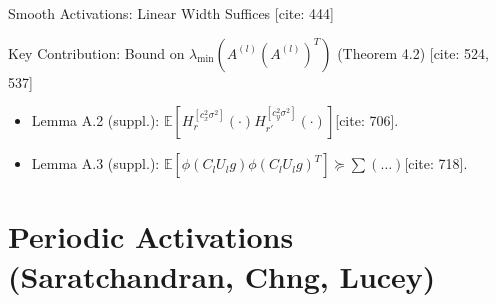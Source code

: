 \documentclass{beamer}
\theoremstyle{definition}
\theoremstyle{remark}
\newcommand{\E}{\mathbb{E}}
\newcommand{\lambdaMin}{\lambda_{\min}}
\begin{document}
\begin{frame}{Smooth Activations: Linear Width Suffices [cite: 444]}
\begin{block}{Key Contribution: Bound on $\lambdaMin(A^{(l)}(A^{(l)})^T)$ (Theorem 4.2) [cite: 524, 537]}
\begin{enumerate}
        \begin{itemize}
          \item Lemma A.2 (suppl.): $\E[H_r^{[c_x^2\sigma^2]}(\cdot) H_{r'}^{[c_y^2\sigma^2]}(\cdot)]$[cite: 706].
          \item Lemma A.3 (suppl.): $\E[\phi(C_lU_lg)\phi(C_lU_lg)^T] \succeq \sum (\dots)$[cite: 718].
        \end{itemize}
    \end{enumerate}
  \end{block}
\end{frame}

\section{Periodic Activations (Saratchandran, Chng, Lucey)}
\end{document}
